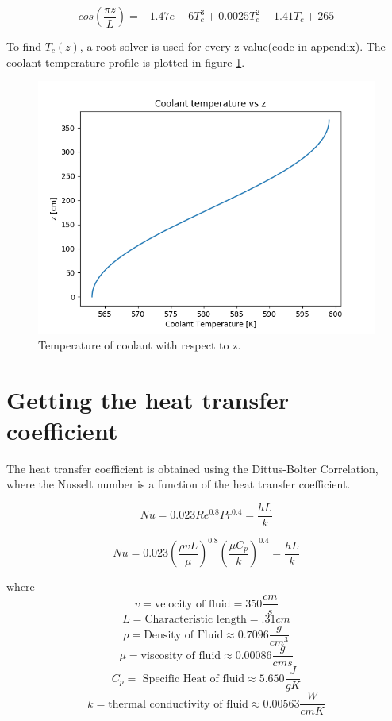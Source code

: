 \documentclass[12pt,letterpaper]{article}
\begin{document}
\[ cos(\frac{\pi z}{L}) = -1.47e-6T_c^3 + 0.0025T_c^2 -1.41 T_c + 265\]

To find $T_c(z)$, a root solver is used for every z value(code in appendix).
The coolant temperature profile is plotted in figure \ref{fig:t_c_z}.

\begin{figure}[htbp!]
    \begin{center}
        \includegraphics[scale=0.7]{t_c_z.png}
    \end{center}
    \caption{Temperature of coolant with respect to z.}
    \label{fig:t_c_z}
\end{figure}


\section*{Getting the heat transfer coefficient}
The heat transfer coefficient is obtained using the Dittus-Bolter Correlation,
where the Nusselt number is a function of the heat transfer coefficient.

\[ Nu = 0.023 Re^{0.8} Pr^{0.4} = \frac{h L}{k}\]

\[ Nu = 0.023 (\frac{\rho v L}{\mu})^{0.8} (\frac{\mu C_p}{k})^{0.4} = \frac{h L}{k}\]

where
\[v = \text{velocity of fluid} = 350 \frac{cm}{s}\]
\[L = \text{Characteristic length} = .31 cm \]
\[\rho = \text{Density of Fluid} \approx 0.7096 \frac{g}{cm^3}\]
\[\mu = \text{viscosity of fluid} \approx 0.00086 \frac{g}{cm s}\]
\[C_p = \text{ Specific Heat of fluid} \approx 5.650 \frac{J}{g K} \]
\[k = \text{thermal conductivity of fluid} \approx 0.00563\frac{W}{cm K} \]
\end{document}

